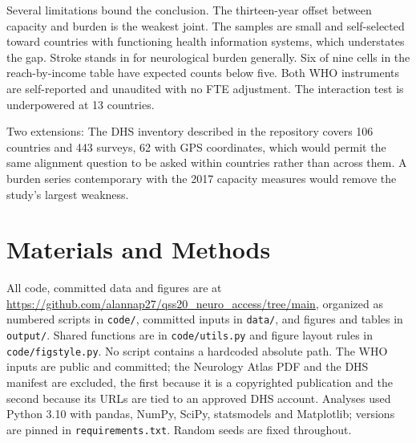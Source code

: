 \documentclass[9pt,twoside]{pnas-new}
\begin{document}
Several limitations bound the conclusion. The thirteen-year offset between capacity
and burden is the weakest joint. The samples are small and self-selected toward
countries with functioning health information systems, which understates the
gap. Stroke stands in for neurological burden generally. Six of nine cells in
the reach-by-income table have expected counts below five. Both WHO instruments
are self-reported and unaudited with no FTE adjustment. The interaction test
is underpowered at 13 countries. 

Two extensions: The DHS inventory described in the repository
covers 106 countries and 443 surveys, 62 with GPS coordinates, which would
permit the same alignment question to be asked within countries rather
than across them. A burden series contemporary with the 2017 capacity
measures would remove the study's largest weakness.
\section*{Materials and Methods}

All code, committed data and figures are at
\url{https://github.com/alannap27/qss20_neuro_access/tree/main}, organized as numbered
scripts in \texttt{code/}, committed inputs in \texttt{data/}, and figures and
tables in \texttt{output/}. Shared functions are in \texttt{code/utils.py} and
figure layout rules in \texttt{code/figstyle.py}. No script contains a hardcoded
absolute path. The WHO inputs are public and committed; the Neurology Atlas PDF
and the DHS manifest are excluded, the first because it is a copyrighted
publication and the second because its URLs are tied to an approved DHS account.
Analyses used Python 3.10 with pandas, NumPy, SciPy, statsmodels and Matplotlib;
versions are pinned in \texttt{requirements.txt}. Random seeds are fixed
throughout.



\showacknow %
\end{document}
